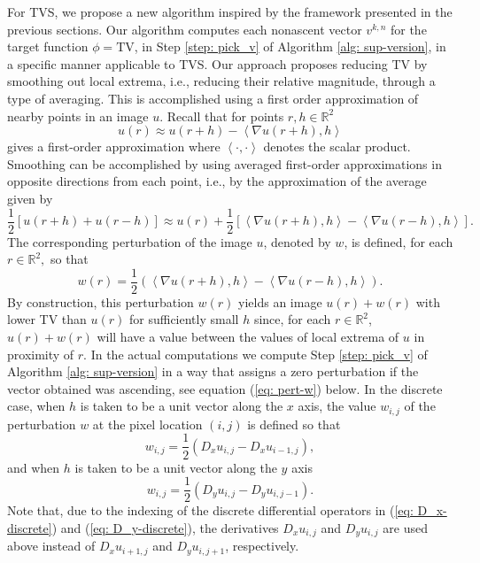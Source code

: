 \documentclass[smallextended]{svjour3}      %
\begin{document}
For TVS, we propose a new algorithm inspired by the framework presented in the previous sections. Our algorithm computes each nonascent vector $v^{k,n}$ for the target function $\phi=\mbox{TV}$, in Step \ref{step: pick_v} of Algorithm \ref{alg: sup-version}, in a specific manner applicable to TVS. Our approach proposes reducing TV by smoothing out local extrema, i.e., reducing their relative magnitude, through a type of averaging. This is accomplished using a first order approximation of nearby points in an image $u$. Recall that for points $r,h\in\mathbb{R}^{2}$
\begin{equation}
u(r)\approx u(r+h)-\left\langle \nabla u(r+h),h\right\rangle
\end{equation}
gives a first-order approximation where $\left\langle \cdot,\cdot\right\rangle $ denotes the scalar product. Smoothing can be accomplished by using averaged first-order approximations in opposite directions from each point, i.e., by the approximation of the average given by
\begin{equation}
\dfrac{1}{2}\left[u(r+h)+u(r-h)\right]\approx u(r)+\dfrac{1}{2}\left[\left\langle \nabla u(r+h),h\right\rangle -\left\langle \nabla u(r-h),h\right\rangle \right].
\end{equation}
The corresponding perturbation of the image $u$, denoted by $w$, is defined, for each $r\in\mathbb{R}^{2},$ so that
\begin{equation}
w(r)=\dfrac{1}{2}\left(\left\langle \nabla u(r+h),h\right\rangle -\left\langle \nabla u(r-h),h\right\rangle \right).\label{eq: perturbation-continuous}
\end{equation}
By construction, this perturbation $w(r)$ yields an image $u(r)+w(r)$ with lower TV than $u(r)$ for sufficiently small $h$ since, for each $r\in\mathbb{R}^{2}$, $u(r)+w(r)$ will have a value between the values of local extrema of $u$ in proximity of $r$. In the actual computations we compute Step \ref{step: pick_v} of Algorithm \ref{alg: sup-version} in a way that assigns a zero perturbation if the vector obtained was ascending, see equation (\ref{eq: pert-w}) below. In the discrete case, when $h$ is taken to be a unit vector along the $x$ axis, the value $w_{i,j}$ of the perturbation $w$ at the pixel location $(i,j)$ is defined so that
\begin{equation}
w_{i,j}=\dfrac{1}{2}\left(D_{x}u_{i,j}-D_{x}u_{i-1,j}\right),
\end{equation}
and when $h$ is taken to be a unit vector along the $y$ axis
\begin{equation}
w_{i,j}=\dfrac{1}{2}\left(D_{y}u_{i,j}-D_{y}u_{i,j-1}\right).
\end{equation}
Note that, due to the indexing of the discrete differential operators in (\ref{eq: D_x-discrete}) and (\ref{eq: D_y-discrete}), the derivatives $D_{x}u_{i,j}$ and $D_{y}u_{i,j}$ are used above instead of $D_{x}u_{i+1,j}$ and $D_{y}u_{i,j+1}$, respectively.
\end{document}
